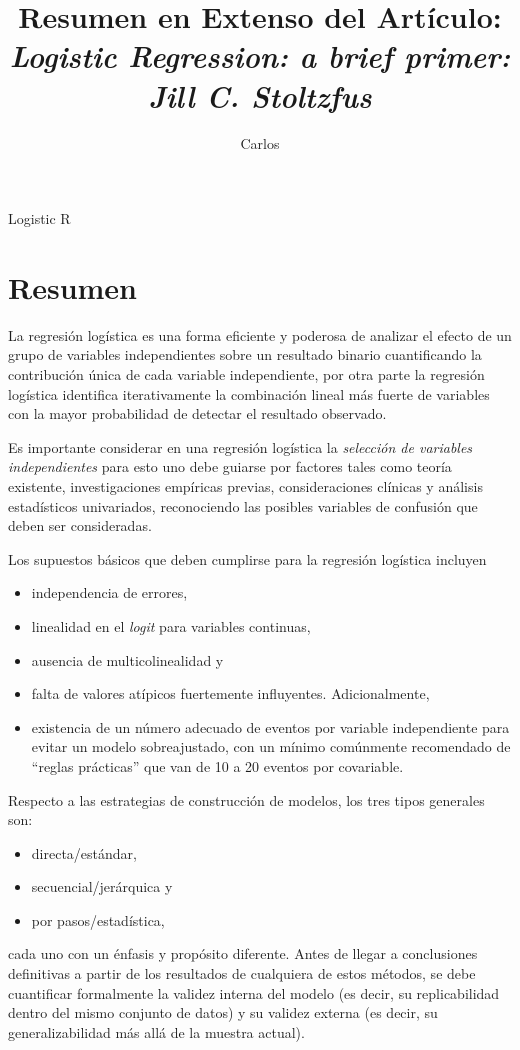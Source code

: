 \documentclass[12pt]{article}
\title{Resumen en Extenso del Art\'iculo: \\
\textit{Logistic Regression: a brief primer: Jill C. Stoltzfus}}
\author{Carlos}
\date{}
\begin{document}
\maketitle
\tableofcontents
Logistic R


\section{Resumen}

La regresi\'on log\'istica es una forma eficiente y poderosa de analizar el efecto de un grupo de variables independientes sobre un resultado binario cuantificando la contribuci\'on \'unica de cada variable independiente, por otra parte la regresi\'on log\'istica identifica iterativamente la combinaci\'on lineal m\'as fuerte de variables con la mayor probabilidad de detectar el resultado observado.

Es importante considerar en una regresi\'on log\'istica la \textit{selecci\'on de variables independientes} para esto uno debe guiarse por factores tales como teor\'ia existente, investigaciones emp\'iricas previas, consideraciones cl\'inicas y an\'alisis estad\'isticos univariados, reconociendo las posibles variables de confusi\'on que deben ser consideradas. 

Los supuestos b\'asicos que deben cumplirse para la regresi\'on log\'istica incluyen
\begin{itemize}
\item independencia de errores, 
\item linealidad en el \textit{logit} para variables continuas, 
\item ausencia de multicolinealidad y 
\item falta de valores at\'ipicos fuertemente influyentes. Adicionalmente, 
\item existencia de un n\'umero adecuado de eventos por variable independiente para evitar un modelo sobreajustado, con un m\'inimo com\'unmente recomendado de “reglas pr\'acticas” que van de 10 a 20 eventos por covariable.
\end{itemize}

Respecto a las estrategias de construcci\'on de modelos, los tres tipos generales son: 
\begin{itemize}
\item directa/est\'andar, 
\item secuencial/jer\'arquica y 
\item por pasos/estad\'istica,
\end{itemize}
cada uno con un \'enfasis y prop\'osito diferente. Antes de llegar a conclusiones definitivas a partir de los resultados de cualquiera de estos m\'etodos, se debe cuantificar formalmente la validez interna del modelo (es decir, su replicabilidad dentro del mismo conjunto de datos) y su validez externa (es decir, su generalizabilidad m\'as all\'a de la muestra actual).
\end{document}
